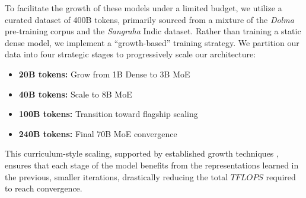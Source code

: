 To facilitate the growth of these models under a limited budget, we utilize a curated dataset of 400B tokens, primarily sourced from a mixture of the \textit{Dolma} pre-training corpus and the \textit{Sangraha} Indic dataset. Rather than training a static dense model, we implement a ``growth-based'' training strategy. We partition our data into four strategic stages to progressively scale our architecture:
\begin{itemize}
    \item \textbf{20B tokens:} Grow from 1B Dense to 3B MoE
    \item \textbf{40B tokens:} Scale to 8B MoE 
    \item \textbf{100B tokens:} Transition toward flagship scaling
    \item \textbf{240B tokens:} Final 70B MoE convergence
\end{itemize}



This curriculum-style scaling, supported by established growth techniques \cite{RefC2023, RefD2024}, ensures that each stage of the model benefits from the representations learned in the previous, smaller iterations, drastically reducing the total $TFLOPS$ required to reach convergence.